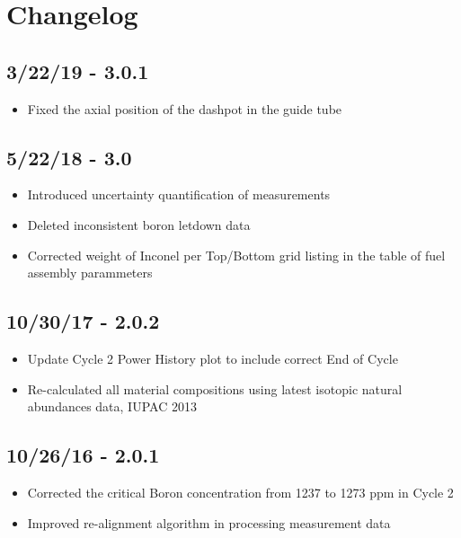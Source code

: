 \section*{Changelog}

\subsection*{3/22/19 - 3.0.1}
\begin{itemize}
  \item Fixed the axial position of the dashpot in the guide tube
\end{itemize}

\subsection*{5/22/18 - 3.0}
\begin{itemize}
  \item Introduced uncertainty quantification of measurements
  \item Deleted inconsistent boron letdown data
  \item Corrected weight of Inconel per Top/Bottom grid listing in the table of
        fuel assembly parammeters
\end{itemize}

\subsection*{10/30/17 - 2.0.2}
\begin{itemize}
  \item Update Cycle 2 Power History plot to include correct End of Cycle
  \item Re-calculated all material compositions using latest isotopic natural
        abundances data, IUPAC 2013
\end{itemize}

\subsection*{10/26/16 - 2.0.1}
\begin{itemize}
  \item Corrected the critical Boron concentration from 1237 to 1273 ppm in Cycle 2
  \item Improved re-alignment algorithm in processing measurement data
\end{itemize}

